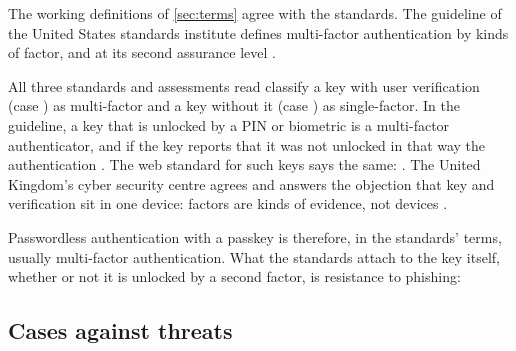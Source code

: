 The working definitions of \cref{sec:terms} agree with the standards.
The guideline of the United States standards institute defines
multi-factor authentication by kinds of factor, and at its second
assurance level
.

All three standards and assessments read classify a key with user
verification (case ) as multi-factor and a key without it (case
) as single-factor.
In the guideline, a key that is unlocked by a PIN or biometric is a
multi-factor authenticator, and if the key reports that it was not
unlocked in that way the authentication
.
The web standard for such keys says the same:
.
The United Kingdom's cyber security centre agrees and answers the
objection that key and verification sit in one device: factors are kinds
of evidence, not devices \autocite{NCSC2026CredentialsPaper}.

Passwordless authentication with a passkey is therefore, in the
standards' terms, usually multi-factor authentication.
What the standards attach to the key itself, whether or not it is
unlocked by a second factor, is resistance to phishing:

\subsection{Cases against threats}\label{sec:res-table}

